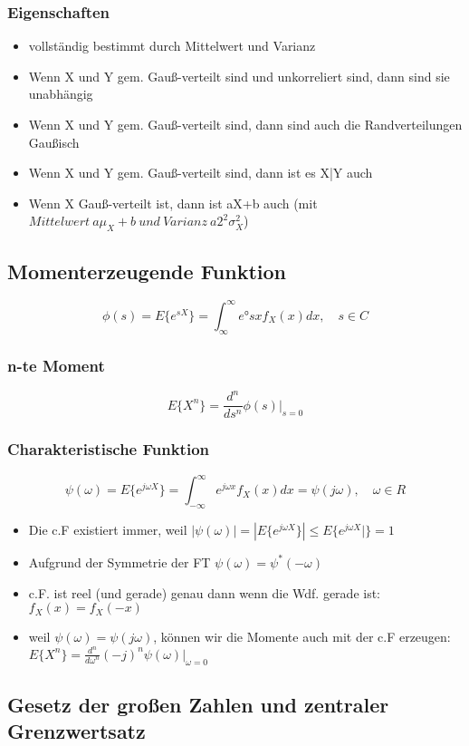 \documentclass{article}
\begin{document}
\subsubsection{Eigenschaften}
\begin{itemize}
\item vollständig bestimmt durch Mittelwert und Varianz
\item Wenn X und Y gem. Gau\ss-verteilt sind und unkorreliert sind, dann sind sie unabhängig
\item Wenn X und Y gem. Gau\ss-verteilt sind, dann sind auch die Randverteilungen Gau\ss isch
\item Wenn X und Y gem. Gau\ss-verteilt sind, dann ist es X|Y auch
\item Wenn X Gau\ss-verteilt ist, dann ist aX+b auch (mit $ Mittelwert \: a\mu_X + b \: und \: Varianz \: a2^2\sigma_X^2$)

\end{itemize}
\subsection{Momenterzeugende Funktion}
$$\phi(s) = E\{e^{sX}\} = \int_{\infty}^{\infty}e°{sx} f_X(x) dx,\quad s \in C $$
\subsubsection{n-te Moment}
$$E\{X^n\} = \frac{d^n}{ds^n} \phi(s)|_{s=0}$$
\subsubsection{Charakteristische Funktion}
$$\psi(\omega) = E\{e^{j\omega X}\} = \int_{-\infty}^{\infty} e^{j\omega x}f_X(x) dx =  \psi(j\omega), \quad \omega \in R$$
\begin {itemize}
\item  Die c.F existiert immer, weil $|\psi(\omega)| = |E\{ e^{j\omega X}\}| \le E\{e^{j\omega X}|\} = 1$
\item Aufgrund der Symmetrie der FT $\psi(\omega) = \psi^*(-\omega)$
\item c.F. ist reel (und gerade) genau dann wenn die Wdf. gerade ist: $f_X(x) = f_X(-x)$
\item weil $\psi(\omega) = \psi(j\omega)$, können wir die Momente auch mit der c.F erzeugen: $E\{X^n\} = \frac{d^n}{d\omega^n}(-j)^n\psi(\omega)|_{\omega = 0}$
\end{itemize}
\subsection{Gesetz der gro\ss en Zahlen und zentraler Grenzwertsatz}
\end{document}

